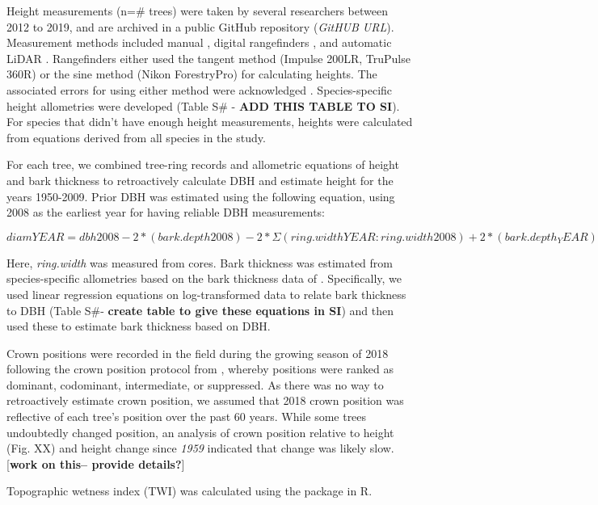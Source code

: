 \documentclass[]{article}
\begin{document}
Height measurements (n=\# trees) were taken by several researchers
between 2012 to 2019, and are archived in a public GitHub repository
(\emph{GitHUB URL}). Measurement methods included manual
\citep[NEON]{stovall_assessing_2018}, digital rangefinders
\citep{andersonteixeira_size-related_2015}, and automatic LiDAR
\citep{stovall_terrestrial_2018}. Rangefinders either used the tangent
method (Impulse 200LR, TruPulse 360R) or the sine method (Nikon
ForestryPro) for calculating heights. The associated errors for using
either method were acknowledged \citep{larjavaara_measuring_2013}.
Species-specific height allometries were developed (Table S\# -
\textbf{ADD THIS TABLE TO SI}). For species that didn't have enough
height measurements, heights were calculated from equations derived from
all species in the study.

For each tree, we combined tree-ring records and allometric equations of
height and bark thickness to retroactively calculate DBH and estimate
height for the years 1950-2009. Prior DBH was estimated using the
following equation, using 2008 as the earliest year for having reliable
DBH measurements:

\[ diamYEAR = dbh2008 - 2*(bark.depth2008) - 2*\Sigma(ring.widthYEAR:ring.width2008) + 2*(bark.depth_YEAR) \]

Here, \emph{ring.width} was measured from cores. Bark thickness was
estimated from species-specific allometries based on the bark thickness
data of \citep{andersonteixeira_size-related_2015}. Specifically, we
used linear regression equations on log-transformed data to relate bark
thickness to DBH (Table S\#- \textbf{create table to give these
equations in SI}) and then used these to estimate bark thickness based
on DBH.

Crown positions were recorded in the field during the growing season of
2018 following the crown position protocol from
\citep{jennings_assessing_1999}, whereby positions were ranked as
dominant, codominant, intermediate, or suppressed. As there was no way
to retroactively estimate crown position, we assumed that 2018 crown
position was reflective of each tree's position over the past 60 years.
While some trees undoubtedly changed position, an analysis of crown
position relative to height (Fig. XX) and height change since
\emph{1959} indicated that change was likely slow. {[}\textbf{work on
this-- provide details?}{]}

Topographic wetness index (TWI) was calculated using the
\citep{R-dynatopmodel} package in R.
\end{document}
